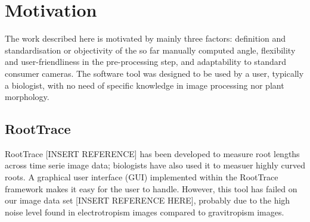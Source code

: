 \section{Motivation}
The work described here is motivated by mainly three factors: definition and standardisation  or objectivity of the so far manually computed angle, flexibility and user-friendliness in the pre-processing step, and adaptability to standard consumer cameras. The software tool was designed to be used by a user, typically a biologist, with no need of specific knowledge in image processing nor plant morphology.

\subsection{RootTrace}

RootTrace [INSERT REFERENCE] has been developed to measure root lengths across time serie image data; biologists have also used it to measuer highly curved roots. A graphical user interface (GUI) implemented within the RootTrace framework makes it easy for the user to handle. However, this tool has failed on our image data set [INSERT REFERENCE HERE], probably due to the high noise level found in electrotropism images compared to gravitropism images.


%
%
%

